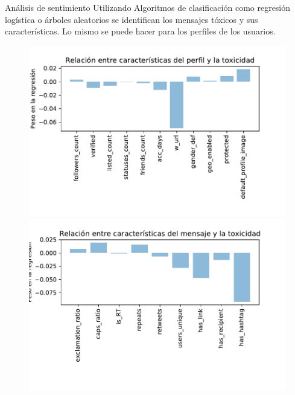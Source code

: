 \documentclass[11pt,usenames, dvipsnames]{beamer}
\begin{document}
\begin{frame}{Análisis de sentimiento}
Utilizando Algoritmos de clasificación como regresión logística o árboles aleatorios se identifican los mensajes tóxicos y sus características. Lo mismo se puede hacer para los perfiles de los usuarios.
    \begin{figure}
        \centering
        \begin{minipage}{0.49\textwidth}
            \includegraphics[width=1\linewidth]{figures/sentimientoUsuario}
        \end{minipage}
        \begin{minipage}{0.49\textwidth}
            \includegraphics[width=1\linewidth]{figures/sentimientoMensaje}
        \end{minipage}    
    \end{figure}
\end{frame}
\end{document}
